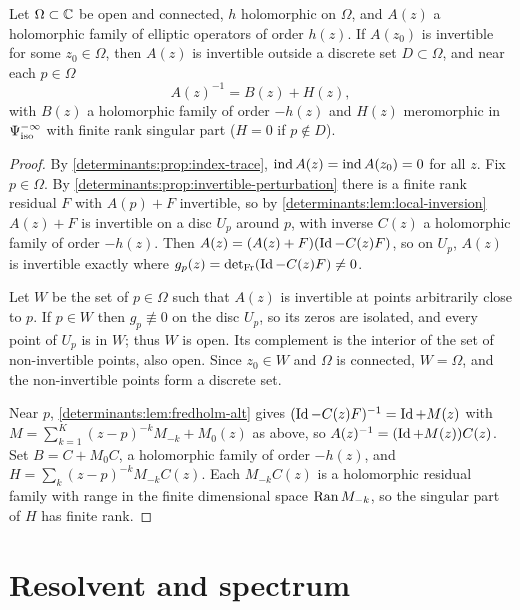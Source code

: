 \begin{proposition}\label{determinants:prop:analytic-fredholm}
  Let $\Omega\subset\mathbb{C}$ be open and connected, $h$ holomorphic on $\Omega$, and
  $A(z)$ a holomorphic family of elliptic operators of order $h(z)$. If $A(z_0)$
  is invertible for some $z_0\in\Omega$, then $A(z)$ is invertible outside a
  discrete set $D\subset\Omega$, and near each $p\in\Omega$
  \begin{equation*}
    A(z)^{-1}=B(z)+H(z),
  \end{equation*}
  with $B(z)$ a holomorphic family of order $-h(z)$ and $H(z)$ meromorphic in
  $\Psi^{-\infty}_{\mathrm{iso}}$ with finite rank singular part ($H=0$ if $p\notin D$).
\end{proposition}
\begin{proof}
  By \cref{determinants:prop:index-trace}, $\operatorname{ind} A(z)=\operatorname{ind} A(z_0)=0$ for all
  $z$. Fix $p\in\Omega$. By \cref{determinants:prop:invertible-perturbation}
  there is a finite rank residual $F$ with $A(p)+F$ invertible, so by
  \cref{determinants:lem:local-inversion} $A(z)+F$ is invertible on a disc
  $U_p$ around $p$, with inverse $C(z)$ a holomorphic family of order $-h(z)$.
  Then $A(z)=(A(z)+F)(\operatorname{Id}-C(z)F)$, so on $U_p$, $A(z)$ is invertible exactly
  where $g_p(z)=\operatorname{det}_{\mathrm{Fr}}(\operatorname{Id}-C(z)F)\ne0$.

  Let $W$ be the set of $p\in\Omega$ such that $A(z)$ is invertible at points
  arbitrarily close to $p$. If $p\in W$ then $g_p\not\equiv0$ on the disc
  $U_p$, so its zeros are isolated, and every point of $U_p$ is in $W$; thus
  $W$ is open. Its complement is the interior of the set of non-invertible
  points, also open. Since $z_0\in W$ and $\Omega$ is connected, $W=\Omega$,
  and the non-invertible points form a discrete set.

  Near $p$, \cref{determinants:lem:fredholm-alt} gives
  $(\operatorname{Id}-C(z)F)^{-1}=\operatorname{Id}+M(z)$ with $M=\sum_{k=1}^K(z-p)^{-k}M_{-k}+M_0(z)$ as
  above, so $A(z)^{-1}=(\operatorname{Id}+M(z))C(z)$. Set $B=C+M_0C$, a holomorphic family of
  order $-h(z)$, and $H=\sum_k(z-p)^{-k}M_{-k}C(z)$. Each $M_{-k}C(z)$ is a
  holomorphic residual family with range in the finite dimensional space
  $\operatorname{Ran} M_{-k}$, so the singular part of $H$ has finite rank.
\end{proof}

\section{Resolvent and spectrum}\label{determinants:sec:resolvent}

